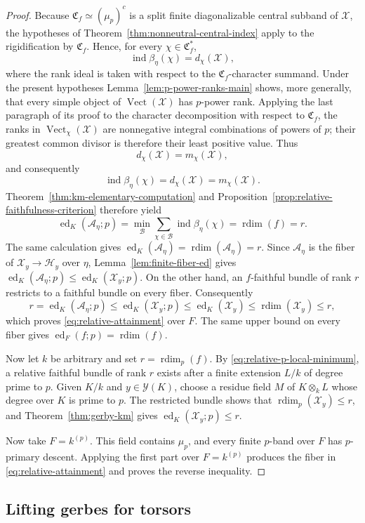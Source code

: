 \documentclass[11pt,reqno]{amsart}
\numberwithin{equation}{section}
\theoremstyle{plain}
\theoremstyle{definition}
\def\cA{{\mathcal A}}
\def\cH{{\mathcal H}}
\def\cX{{\mathcal X}}
\def\cY{{\mathcal Y}}
\def\fC{{\mathfrak C}}
\def\ind{{\operatorname{ind}}}
\def\Vect{{\operatorname{Vect}}}
\def\rdim{{\operatorname{rdim}}}
\def\ed{{\operatorname{ed}}}
\begin{document}
\begin{proof}
Because $\fC_f\simeq(\mu_p)^c$ is a split finite diagonalizable
central subband of $\cX$, the hypotheses of
Theorem~\ref{thm:nonneutral-central-index} apply to the rigidification by
$\fC_f$.  Hence, for every $\chi\in\fC_f^*$,
\[
\ind\beta_\eta(\chi)=d_\chi(\cX),
\]
where the rank ideal is taken with respect to the $\fC_f$-character
summand.  Under the present hypotheses Lemma~\ref{lem:p-power-ranks-main}
shows, more generally, that every simple object of $\Vect(\cX)$ has
$p$-power rank.  Applying the last paragraph of its proof to the
character decomposition with respect to $\fC_f$, the ranks in
$\Vect_\chi(\cX)$ are nonnegative integral combinations of powers of
$p$; their greatest common divisor is therefore their least positive
value.  Thus
\[
d_\chi(\cX)=m_\chi(\cX),
\]
and consequently
\[
\ind\beta_\eta(\chi)=d_\chi(\cX)=m_\chi(\cX).
\]
Theorem~\ref{thm:km-elementary-computation} and
Proposition~\ref{prop:relative-faithfulness-criterion} therefore yield
\[
\ed_K(\cA_\eta;p)
=\min_{\mathcal B}
\sum_{\chi\in\mathcal B}\ind\beta_\eta(\chi)
=\rdim(f)=r.
\]
The same calculation gives
$\ed_K(\cA_\eta)=\rdim(\cA_\eta)=r$.
Since $\cA_\eta$ is the fiber of $\cX_y\to\cH_y$ over $\eta$,
Lemma~\ref{lem:finite-fiber-ed} gives
$\ed_K(\cA_\eta;p)\leq\ed_K(\cX_y;p)$.  On the other hand, an
$f$-faithful bundle of rank $r$ restricts to a faithful bundle on every
fiber.  Consequently
\[
r=\ed_K(\cA_\eta;p)
\leq\ed_K(\cX_y;p)
\leq\ed_K(\cX_y)
\leq\rdim(\cX_y)
\leq r,
\]
which proves \eqref{eq:relative-attainment} over $F$.  The same upper
bound on every fiber gives
$\ed_F(f;p)=\rdim(f)$.

Now let $k$ be arbitrary and set $r=\rdim_p(f)$.
By \eqref{eq:relative-p-local-minimum}, a relative faithful bundle of
rank $r$ exists after a finite extension $L/k$ of degree prime to
$p$.  Given $K/k$ and $y\in\cY(K)$, choose a residue field $M$ of
$K\otimes_kL$ whose degree over $K$ is prime to $p$.  The restricted
bundle shows that
$\rdim_p(\cX_y)\leq r$, and
Theorem~\ref{thm:gerby-km} gives
$\ed_K(\cX_y;p)\leq r$.

Now take $F=k^{(p)}$.  This field contains $\mu_p$, and every finite
$p$-band over $F$ has $p$-primary descent.  Applying the first part over
$F=k^{(p)}$ produces the fiber in \eqref{eq:relative-attainment} and
proves the reverse inequality.
\end{proof}

\subsection{Lifting gerbes for torsors}
\end{document}
